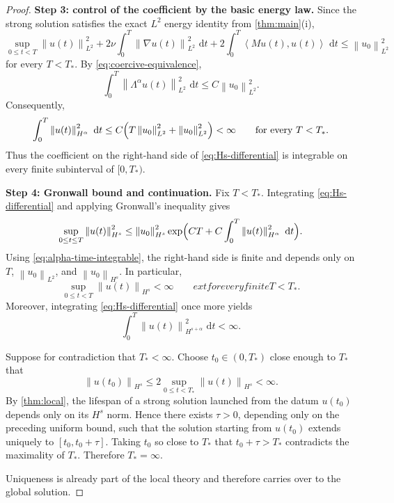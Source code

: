 \documentclass[11pt]{article}
\theoremstyle{definition}
\theoremstyle{remark}
\newcommand{\dd}{\,\mathrm{d}}
\newcommand{\ip}[2]{\left\langle #1,#2\right\rangle}
\newcommand{\norm}[1]{\left\lVert #1\right\rVert}
\begin{document}
\begin{proof}
\smallskip
\noindent\textbf{Step 3: control of the coefficient by the basic energy law.}
Since the strong solution satisfies the exact $L^2$ energy identity from \cref{thm:main}(i),
\begin{equation}\label{eq:lions-basic-energy}
\sup_{0\le t<T}\norm{u(t)}_{L^2}^2
+2\nu\int_0^T\norm{\nabla u(t)}_{L^2}^2\,\dd t
+2\int_0^T\ip{Mu(t)}{u(t)}\,\dd t
\le \norm{u_0}_{L^2}^2
\end{equation}
for every $T<T_*$. By \eqref{eq:coercive-equivalence},
\[
\int_0^T \norm{\Lambda^\alpha u(t)}_{L^2}^2\,\dd t
\le C\norm{u_0}_{L^2}^2.
\]
Consequently,
\begin{equation}\label{eq:alpha-time-integrable}
\int_0^T \norm{u(t)}_{H^\alpha}^2\,\dd t
\le C\Bigl(T\norm{u_0}_{L^2}^2+\norm{u_0}_{L^2}^2\Bigr)
<\infty
\qquad\text{for every }T<T_*.
\end{equation}
Thus the coefficient on the right-hand side of \eqref{eq:Hs-differential} is integrable on every finite subinterval of $[0,T_*)$.

\smallskip
\noindent\textbf{Step 4: Gronwall bound and continuation.}
Fix $T<T_*$. Integrating \eqref{eq:Hs-differential} and applying Gronwall's inequality gives
\begin{equation}\label{eq:Hs-global-bound}
\sup_{0\le t\le T}\norm{u(t)}_{H^s}^2
\le
\norm{u_0}_{H^s}^2
\exp\Bigl(C T + C\int_0^T\norm{u(t)}_{H^\alpha}^2\,\dd t\Bigr).
\end{equation}
Using \eqref{eq:alpha-time-integrable}, the right-hand side is finite and depends only on $T$, $\norm{u_0}_{L^2}$, and $\norm{u_0}_{H^s}$. In particular,
\[
\sup_{0\le t<T}\norm{u(t)}_{H^s}<\infty
\qquad	ext{for every finite }T<T_*.
\]
Moreover, integrating \eqref{eq:Hs-differential} once more yields
\[
\int_0^T\norm{u(t)}_{H^{s+\alpha}}^2\,\dd t<\infty.
\]

Suppose for contradiction that $T_*<\infty$. Choose $t_0\in(0,T_*)$ close enough to $T_*$ that
\[
\norm{u(t_0)}_{H^s}\le 2\sup_{0\le t<T_*}\norm{u(t)}_{H^s}<\infty.
\]
By \cref{thm:local}, the lifespan of a strong solution launched from the datum $u(t_0)$ depends only on its $H^s$ norm. Hence there exists $\tau>0$, depending only on the preceding uniform bound, such that the solution starting from $u(t_0)$ extends uniquely to $[t_0,t_0+\tau]$. Taking $t_0$ so close to $T_*$ that $t_0+\tau>T_*$ contradicts the maximality of $T_*$. Therefore $T_*=\infty$.

Uniqueness is already part of the local theory and therefore carries over to the global solution.
\end{proof}
\end{document}
